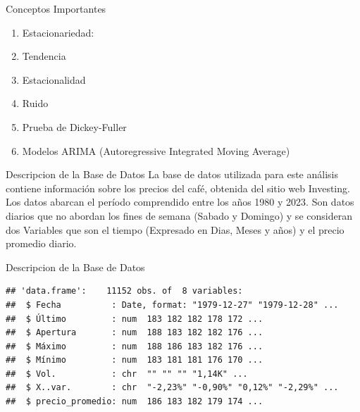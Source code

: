 \documentclass[
  10pt,
  ignorenonframetext,
  aspectratio=1612]{beamer}
\begin{document}
\begin{frame}{Conceptos Importantes}
\label{conceptos-importantes}
\begin{enumerate}

  \item Estacionariedad:
  
  \item Tendencia
  
  \item Estacionalidad
  
  \item Ruido
  
  \item Prueba de Dickey-Fuller
  
  \item Modelos ARIMA (Autoregressive Integrated Moving Average)
  
  


\end{enumerate}
\end{frame}

\begin{frame}{Descripcion de la Base de Datos}
\label{descripcion-de-la-base-de-datos}
La base de datos utilizada para este análisis contiene información sobre
los precios del café, obtenida del sitio web Investing. Los datos
abarcan el período comprendido entre los años 1980 y 2023. Son datos
diarios que no abordan los fines de semana (Sabado y Domingo) y se
consideran dos Variables que son el tiempo (Expresado en Dias, Meses y
años) y el precio promedio diario.
\end{frame}

\begin{frame}[fragile]{Descripcion de la Base de Datos}
\label{descripcion-de-la-base-de-datos-1}
\begin{verbatim}
## 'data.frame':    11152 obs. of  8 variables:
##  $ Fecha          : Date, format: "1979-12-27" "1979-12-28" ...
##  $ Último         : num  183 182 182 178 172 ...
##  $ Apertura       : num  188 183 182 182 176 ...
##  $ Máximo         : num  188 186 183 182 176 ...
##  $ Mínimo         : num  183 181 181 176 170 ...
##  $ Vol.           : chr  "" "" "" "1,14K" ...
##  $ X..var.        : chr  "-2,23%" "-0,90%" "0,12%" "-2,29%" ...
##  $ precio_promedio: num  186 183 182 179 174 ...
\end{verbatim}
\end{frame}
\end{document}
